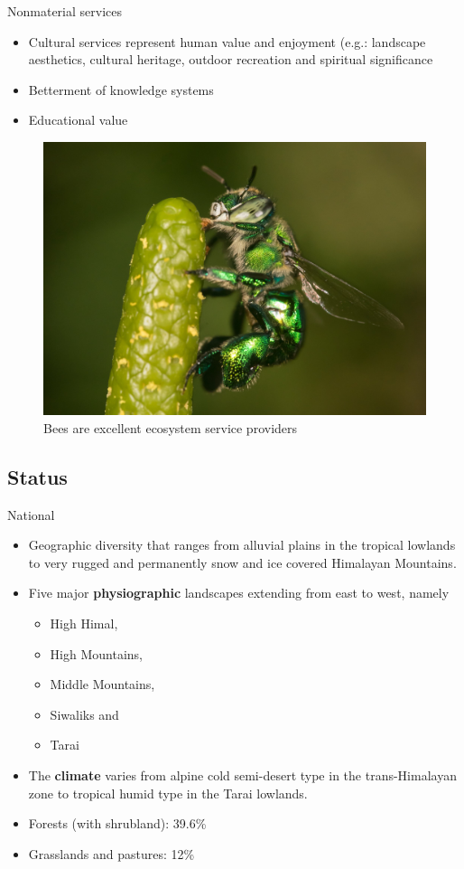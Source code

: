 \documentclass[ignorenonframetext,aspectratio=169]{beamer}
\providecommand{\tightlist}{%
  \setlength{\itemsep}{0pt}\setlength{\parskip}{0pt}}
\begin{document}
\begin{frame}{Nonmaterial services}
\protect\hypertarget{nonmaterial-services}{}

\begin{itemize}
\tightlist
\item
  Cultural services represent human value and enjoyment (e.g.: landscape
  aesthetics, cultural heritage, outdoor recreation and spiritual
  significance
\item
  Betterment of knowledge systems
\item
  Educational value
\end{itemize}

\begin{figure}
\includegraphics[width=0.45\linewidth]{./../images/twttr/bee_D8bkT-lUEAMzS8c} \caption{Bees are excellent ecosystem service providers}\label{fig:pollinator-bees}
\end{figure}

\end{frame}

\hypertarget{status}{%
\subsection{Status}\label{status}}

\begin{frame}{National}
\protect\hypertarget{national}{}

\begin{itemize}
\tightlist
\item
  Geographic diversity that ranges from alluvial plains in the tropical
  lowlands to very rugged and permanently snow and ice covered Himalayan
  Mountains.
\item
  Five major \textbf{physiographic} landscapes extending from east to
  west, namely

  \begin{itemize}
  \tightlist
  \item
    High Himal,
  \item
    High Mountains,
  \item
    Middle Mountains,
  \item
    Siwaliks and
  \item
    Tarai
  \end{itemize}
\item
  The \textbf{climate} varies from alpine cold semi-desert type in the
  trans-Himalayan zone to tropical humid type in the Tarai lowlands.
\item
  Forests (with shrubland): 39.6\%
\item
  Grasslands and pastures: 12\%
\end{itemize}

\end{frame}
\end{document}

